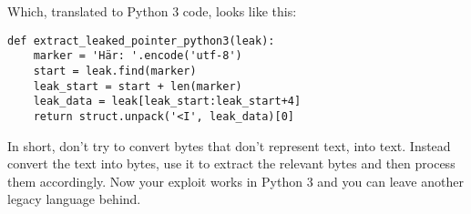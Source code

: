 \documentclass[twocolumn]{article}
\begin{document}
Which, translated to Python 3 code, looks like this:

\begin{verbatim}
def extract_leaked_pointer_python3(leak):
    marker = 'Här: '.encode('utf-8')
    start = leak.find(marker)
    leak_start = start + len(marker)
    leak_data = leak[leak_start:leak_start+4]
    return struct.unpack('<I', leak_data)[0]
\end{verbatim}

\vspace*{-0.7\baselineskip}
In short, don't try to convert bytes that don't represent text, into text. Instead convert the text into bytes, use it to extract the relevant bytes and then process them accordingly. Now your exploit works in Python 3 and you can leave another legacy language behind.
\end{document}
